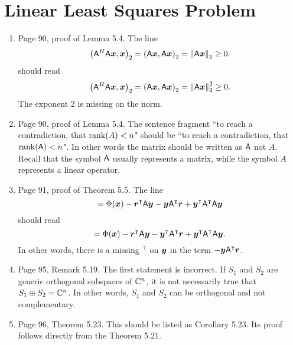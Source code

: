 \documentclass{book}
\begin{document}
	\chapter{Linear Least Squares Problem}
	
	\begin{enumerate}
	\item 
Page 90, proof of Lemma 5.4. The line 
	\[
\left(\mathsf{A}^H\mathsf{A}\boldsymbol{x},\boldsymbol{x}\right)_2 = \left(\mathsf{A}\boldsymbol{x},\mathsf{A}\boldsymbol{x}\right)_2 = \left\| \mathsf{A}\boldsymbol{x} \right\|_2 \ge 0 .
	\]
should read
	\[
\left(\mathsf{A}^H\mathsf{A}\boldsymbol{x},\boldsymbol{x}\right)_2 = \left(\mathsf{A}\boldsymbol{x},\mathsf{A}\boldsymbol{x}\right)_2 = \left\| \mathsf{A}\boldsymbol{x} \right\|_2^2\ge 0 .
	\]
The exponent 2 is missing on the norm.
	\item 
Page 90, proof of Lemma 5.4. The sentence fragment ``to reach a contradiction, that $\operatorname{rank}(A) < n$" should be ``to reach a contradiction, that $\operatorname{rank}(\mathsf{A}) < n$". In other words the matrix should be written as $\mathsf{A}$ not $A$. Recall that the symbol $\mathsf{A}$ usually represents a matrix, while the symbol $A$ represents a linear operator.



	\item
Page 91, proof of Theorem 5.5. The line 
	\[
= \Phi(\boldsymbol{x}) - \boldsymbol{r}^\intercal\mathsf{A}\boldsymbol{y} - \boldsymbol{y}\mathsf{A}^\intercal\boldsymbol{r} + \boldsymbol{y}^\intercal\mathsf{A}^\intercal\mathsf{A}\boldsymbol{y}
	\]
should read
	\[
= \Phi(\boldsymbol{x}) - \boldsymbol{r}^\intercal\mathsf{A}\boldsymbol{y} - \boldsymbol{y}^\intercal\mathsf{A}^\intercal\boldsymbol{r} + \boldsymbol{y}^\intercal\mathsf{A}^\intercal\mathsf{A}\boldsymbol{y}.
	\]
In other words, there is a missing ${}^\intercal$ on $\boldsymbol{y}$ in the term $- \boldsymbol{y}\mathsf{A}^\intercal\boldsymbol{r}$.

	\item
Page 95, Remark 5.19. The first statement is incorrect. If $S_1$ and $S_2$ are generic orthogonal subspaces of $\mathbb C^n$, it is not necessarily true that $S_1\oplus S_2 = \mathbb C^n$. In other words, $S_1$ and $S_2$ can be orthogonal and not complementary.


	\item
Page 96, Theorem 5.23. This should be listed as Corollary 5.23. Its proof follows directly from the Theorem 5.21.


\end{enumerate}
\end{document}
